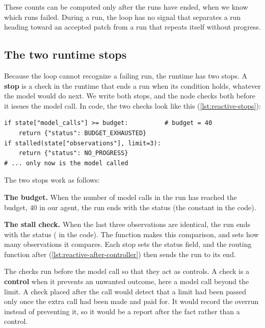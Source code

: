 These counts can be computed only after the runs have ended, when we know which runs failed. During
a run, the loop has no signal that separates a run heading toward an accepted patch from a run that
repeats itself without progress.

\subsection{The two runtime stops}
\label{sec:reactive-stops}

Because the loop cannot recognize a failing run, the runtime has two stops. A \textbf{stop} is a
check in the runtime that ends a run when its condition holds, whatever the model would do next. We
write both stops, and the  node checks both before it issues the model call. In
code, the two checks look like this (\cref{lst:reactive-stops}):

\begin{lstlisting}[basicstyle=\ttfamily\footnotesize, caption={Illustrative code for the two stops, at the start of the controller node.}, label=lst:reactive-stops]
if state["model_calls"] >= budget:          # budget = 40
    return {"status": BUDGET_EXHAUSTED}
if stalled(state["observations"], limit=3):
    return {"status": NO_PROGRESS}
# ... only now is the model called
\end{lstlisting}

The two stops work as follows:
\bi
\item \textbf{The budget.} When the number of model calls in the run has reached the budget, 40 in
our agent, the run ends with the status  (the constant
 in the code).
\item \textbf{The stall check.} When the last three observations are identical, the run ends with
the status  ( in the code). The function
 makes this comparison, and  sets how many observations it
compares.
\ei
Each stop sets the status field, and the routing function after 
(\cref{lst:reactive-after-controller}) then sends the run to its end.

The checks run before the model call so that they act as controls. A check is a \textbf{control}
when it prevents an unwanted outcome, here a model call beyond the limit. A check placed after the
call would detect that a limit had been passed only once the extra call had been made and paid for.
It would record the overrun instead of preventing it, so it would be a report after the fact rather
than a control.

